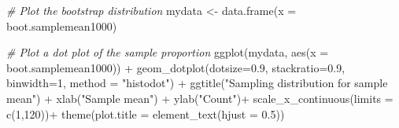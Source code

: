 \documentclass[
]{book}
\newenvironment{Shaded}{\begin{snugshade}}{\end{snugshade}}
\newcommand{\AttributeTok}[1]{\textcolor[rgb]{0.77,0.63,0.00}{#1}}
\newcommand{\CommentTok}[1]{\textcolor[rgb]{0.56,0.35,0.01}{\textit{#1}}}
\newcommand{\ConstantTok}[1]{\textcolor[rgb]{0.00,0.00,0.00}{#1}}
\newcommand{\ControlFlowTok}[1]{\textcolor[rgb]{0.13,0.29,0.53}{\textbf{#1}}}
\newcommand{\DecValTok}[1]{\textcolor[rgb]{0.00,0.00,0.81}{#1}}
\newcommand{\FloatTok}[1]{\textcolor[rgb]{0.00,0.00,0.81}{#1}}
\newcommand{\FunctionTok}[1]{\textcolor[rgb]{0.00,0.00,0.00}{#1}}
\newcommand{\NormalTok}[1]{#1}
\newcommand{\OtherTok}[1]{\textcolor[rgb]{0.56,0.35,0.01}{#1}}
\newcommand{\SpecialCharTok}[1]{\textcolor[rgb]{0.00,0.00,0.00}{#1}}
\newcommand{\StringTok}[1]{\textcolor[rgb]{0.31,0.60,0.02}{#1}}
\begin{document}
\begin{Shaded}
\end{Shaded}

\begin{Shaded}
\begin{Highlighting}[]
\CommentTok{\# Plot the bootstrap distribution}
\NormalTok{mydata }\OtherTok{\textless{}{-}} \FunctionTok{data.frame}\NormalTok{(}\AttributeTok{x =}\NormalTok{ boot.samplemean1000)}

\CommentTok{\# Plot a dot plot of the sample proportion}
\FunctionTok{ggplot}\NormalTok{(mydata, }\FunctionTok{aes}\NormalTok{(}\AttributeTok{x =}\NormalTok{ boot.samplemean1000)) }\SpecialCharTok{+}
  \FunctionTok{geom\_dotplot}\NormalTok{(}\AttributeTok{dotsize=}\FloatTok{0.9}\NormalTok{, }\AttributeTok{stackratio=}\FloatTok{0.9}\NormalTok{, }\AttributeTok{binwidth=}\DecValTok{1}\NormalTok{, }\AttributeTok{method =} \StringTok{"histodot"}\NormalTok{) }\SpecialCharTok{+}
  \FunctionTok{ggtitle}\NormalTok{(}\StringTok{"Sampling distribution for sample mean"}\NormalTok{) }\SpecialCharTok{+}  \FunctionTok{xlab}\NormalTok{(}\StringTok{"Sample mean"}\NormalTok{) }\SpecialCharTok{+} \FunctionTok{ylab}\NormalTok{(}\StringTok{"Count"}\NormalTok{)}\SpecialCharTok{+}
  \FunctionTok{scale\_x\_continuous}\NormalTok{(}\AttributeTok{limits =} \FunctionTok{c}\NormalTok{(}\DecValTok{1}\NormalTok{,}\DecValTok{120}\NormalTok{))}\SpecialCharTok{+} 
  \FunctionTok{theme}\NormalTok{(}\AttributeTok{plot.title =} \FunctionTok{element\_text}\NormalTok{(}\AttributeTok{hjust =} \FloatTok{0.5}\NormalTok{))}
\end{Highlighting}
\end{Shaded}
\end{document}
